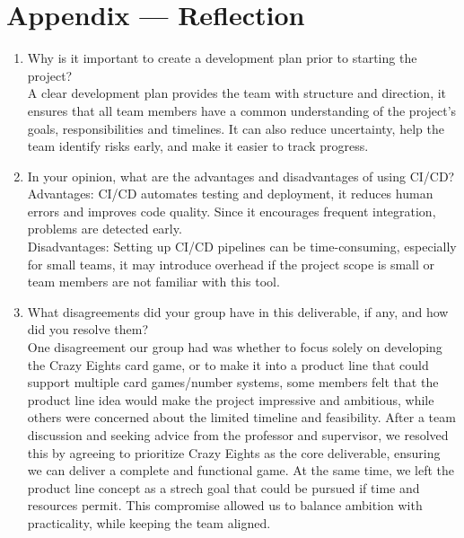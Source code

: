 \documentclass{article}
\begin{document}
\newpage{}

\section*{Appendix --- Reflection}



\begin{enumerate}
    \item Why is it important to create a development plan prior to starting the
    project?\\ A clear development plan provides the team with structure and direction, it ensures that all team members have a common understanding of the project's goals, responsibilities and timelines. It can also reduce uncertainty, help the team identify risks early, and make it easier to track progress.
    \item In your opinion, what are the advantages and disadvantages of using
    CI/CD?\\ Advantages: CI/CD automates testing and deployment,  it reduces human errors and improves code quality.  Since it encourages frequent integration, problems are detected early. \\Disadvantages: Setting up CI/CD pipelines can be time-consuming, especially for small teams, it may introduce overhead if the project scope is small or team members are not familiar with this tool.
    \item What disagreements did your group have in this deliverable, if any,
    and how did you resolve them?\\One disagreement our group had was whether to focus solely on developing the Crazy Eights card game, or to make it into a product line that could support multiple card games/number systems,  some members felt that the product line idea would make the project impressive and ambitious, while others were concerned about the limited timeline and feasibility. After a team discussion and seeking advice from the professor and supervisor, we resolved this by agreeing to prioritize Crazy Eights as the core deliverable, ensuring we can deliver a complete and functional game. At the same time, we left the product line concept as a strech goal that could be pursued if time and resources permit. This compromise allowed us to balance ambition with practicality, while keeping the team aligned.
\end{enumerate}

\newpage{}
\end{document}
